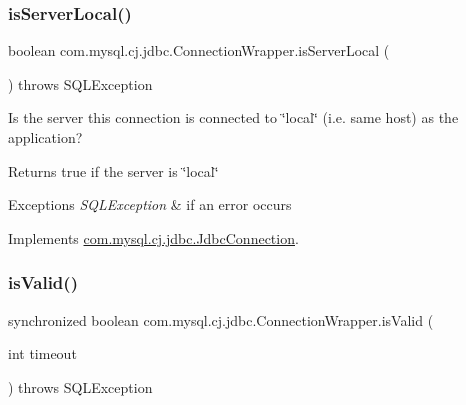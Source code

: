 \mbox{\label{classcom_1_1mysql_1_1cj_1_1jdbc_1_1_connection_wrapper_afe8fab04e181ccd81e0e5bb3881361cd}} 
\subsubsection{\texorpdfstring{is\+Server\+Local()}{isServerLocal()}}
{\footnotesize\ttfamily boolean com.\+mysql.\+cj.\+jdbc.\+Connection\+Wrapper.\+is\+Server\+Local (\begin{DoxyParamCaption}{ }\end{DoxyParamCaption}) throws S\+Q\+L\+Exception}

Is the server this connection is connected to \char`\"{}local\char`\"{} (i.\+e. same host) as the application?

\begin{DoxyReturn}{Returns}
true if the server is \char`\"{}local\char`\"{} 
\end{DoxyReturn}

\begin{DoxyExceptions}{Exceptions}
{\em S\+Q\+L\+Exception} & if an error occurs \\
\hline
\end{DoxyExceptions}


Implements \mbox{\hyperlink{interfacecom_1_1mysql_1_1cj_1_1jdbc_1_1_jdbc_connection_a4418f89cdbd768f892b6ef7823107921}{com.\+mysql.\+cj.\+jdbc.\+Jdbc\+Connection}}.

\mbox{\label{classcom_1_1mysql_1_1cj_1_1jdbc_1_1_connection_wrapper_a2ecfde3f16e6d10473d0bc997d2e2517}} 
\subsubsection{\texorpdfstring{is\+Valid()}{isValid()}}
{\footnotesize\ttfamily synchronized boolean com.\+mysql.\+cj.\+jdbc.\+Connection\+Wrapper.\+is\+Valid (\begin{DoxyParamCaption}\item[{int}]{timeout }\end{DoxyParamCaption}) throws S\+Q\+L\+Exception}


